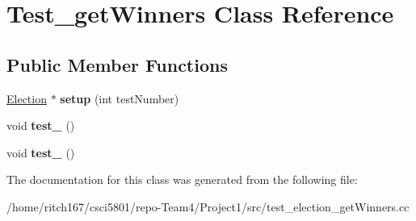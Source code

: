 \hypertarget{classTest__getWinners}{}\section{Test\+\_\+get\+Winners Class Reference}
\label{classTest__getWinners}
\subsection*{Public Member Functions}
\begin{DoxyCompactItemize}
\item 
\mbox{\label{classTest__getWinners_a2e3c96e5c312f3d0ca496c8748d742e4}} 
\hyperlink{classElection}{Election} $\ast$ {\bfseries setup} (int test\+Number)
\item 
\mbox{\label{classTest__getWinners_ae45dbd27773616ab60923a3e8491a712}} 
void {\bfseries test\+\_} ()
\item 
\mbox{\label{classTest__getWinners_aa7b7a6479d3c4d0df802cc4f521d140a}} 
void {\bfseries test\+\_} ()
\end{DoxyCompactItemize}


The documentation for this class was generated from the following file\+:\begin{DoxyCompactItemize}
\item 
/home/ritch167/csci5801/repo-\/\+Team4/\+Project1/src/test\+\_\+election\+\_\+get\+Winners.\+cc\end{DoxyCompactItemize}
